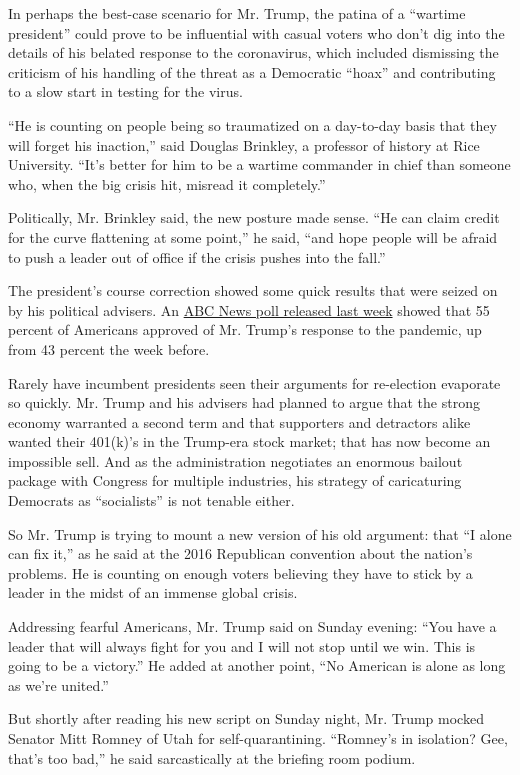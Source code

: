 In perhaps the best-case scenario for Mr. Trump, the patina of a
``wartime president'' could prove to be influential with casual voters
who don't dig into the details of his belated response to the
coronavirus, which included dismissing the criticism of his handling of
the threat as a Democratic ``hoax'' and contributing to a slow start in
testing for the virus.

``He is counting on people being so traumatized on a day-to-day basis
that they will forget his inaction,'' said Douglas Brinkley, a professor
of history at Rice University. ``It's better for him to be a wartime
commander in chief than someone who, when the big crisis hit, misread it
completely.''

Politically, Mr. Brinkley said, the new posture made sense. ``He can
claim credit for the curve flattening at some point,'' he said, ``and
hope people will be afraid to push a leader out of office if the crisis
pushes into the fall.''

The president's course correction showed some quick results that were
seized on by his political advisers. An
\href{https://www.ipsos.com/en-us/news-polls/abc-news-coronavirus-poll}{ABC
News poll released last week} showed that 55 percent of Americans
approved of Mr. Trump's response to the pandemic, up from 43 percent the
week before.

Rarely have incumbent presidents seen their arguments for re-election
evaporate so quickly. Mr. Trump and his advisers had planned to argue
that the strong economy warranted a second term and that supporters and
detractors alike wanted their 401(k)'s in the Trump-era stock market;
that has now become an impossible sell. And as the administration
negotiates an enormous bailout package with Congress for multiple
industries, his strategy of caricaturing Democrats as ``socialists'' is
not tenable either.

So Mr. Trump is trying to mount a new version of his old argument: that
``I alone can fix it,'' as he said at the 2016 Republican convention
about the nation's problems. He is counting on enough voters believing
they have to stick by a leader in the midst of an immense global crisis.

Addressing fearful Americans, Mr. Trump said on Sunday evening: ``You
have a leader that will always fight for you and I will not stop until
we win. This is going to be a victory.'' He added at another point, ``No
American is alone as long as we're united.''

But shortly after reading his new script on Sunday night, Mr. Trump
mocked Senator Mitt Romney of Utah for self-quarantining. ``Romney's in
isolation? Gee, that's too bad,'' he said sarcastically at the briefing
room podium.

